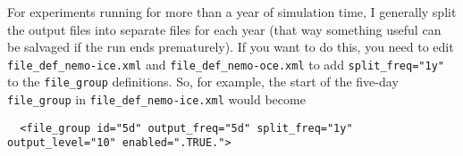 For experiments running for more than a year of simulation time, I generally split the output files into separate files for each year (that way something useful can be salvaged if the run ends prematurely).
If you want to do this, you need to edit \verb|file_def_nemo-ice.xml| and \verb|file_def_nemo-oce.xml| to add \verb|split_freq="1y"| to the \verb|file_group| definitions.
So, for example, the start of the five-day \verb|file_group| in \verb|file_def_nemo-ice.xml| would become

\begingroup
    \small
    \begin{verbatim}
  <file_group id="5d" output_freq="5d" split_freq="1y" output_level="10" enabled=".TRUE.">
    \end{verbatim}
\endgroup
